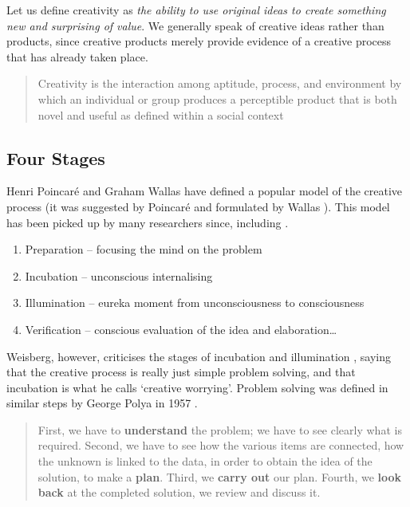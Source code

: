 Let us define creativity as \emph{the ability to use original ideas to create something new and surprising of value}. We generally speak of creative ideas rather than products, since creative products merely provide evidence of a creative process that has already taken place.

\begin{quotation}
  Creativity is the interaction among aptitude, process, and environment by which an individual or group produces a perceptible product that is both novel and useful as defined within a social context 
\end{quotation}


\subsection{Four Stages}
\label{s:4stages}

Henri Poincar{\'e} and Graham Wallas have defined a popular model of the creative process (it was suggested by Poincar{\'e} \citeyear[p.387--400]{Poincare2001} and formulated by Wallas \citeyear{Wallas1926}). This model has been picked up by many researchers since, including \autocite{Boden2003, Koestler1964, Partridge1994}.

\begin{enumerate}
  \item Preparation – focusing the mind on the problem
  \item Incubation – unconscious internalising
  \item Illumination – eureka moment from unconsciousness to consciousness
  \item Verification – conscious evaluation of the idea and elaboration…
\end{enumerate}

Weisberg, however, criticises the stages of incubation and illumination \autocite[as cited in][]{Partridge1994}, saying that the creative process is really just simple problem solving, and that incubation is what he calls `creative worrying'. Problem solving was defined in similar steps by George Polya in 1957 \citeyear{Polya1957}.

\begin{quotation}
  First, we have to \textbf{understand} the problem; we have to see clearly what is required. Second, we have to see how the various items are connected, how the unknown is linked to the data, in order to obtain the idea of the solution, to make a \textbf{plan}. Third, we \textbf{carry out} our plan. Fourth, we \textbf{look back} at the completed solution, we review and discuss it. 
\end{quotation}


